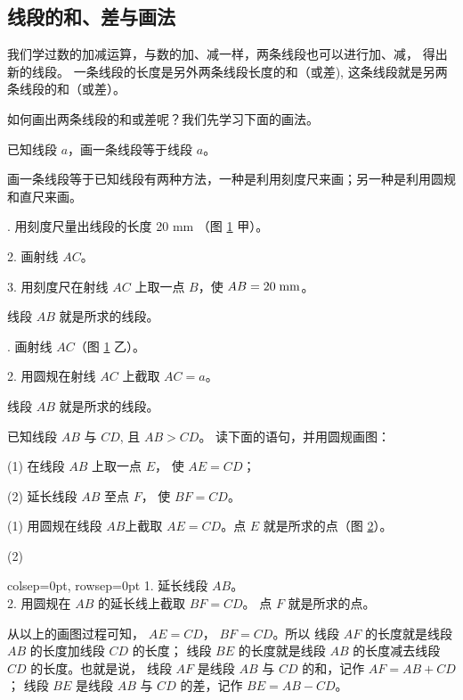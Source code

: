 \subsection{线段的和、差与画法}\label{subsec:czjh1-1-4}

我们学过数的加减运算，与数的加、减一样，两条线段也可以进行加、减， 得出新的线段。
一条线段的长度是另外两条线段长度的和（或差), 这条线段就是另两条线段的和（或差）。

如何画出两条线段的和或差呢？我们先学习下面的画法。

\liti 已知线段 $a$，画一条线段等于线段 $a$。

画一条线段等于已知线段有两种方法，一种是利用刻度尺来画；另一种是利用圆规和直尺来画。

\begin{figure}[htbp]
    \centering
    
    \caption{}\label{fig:czjh1-1-15}
\end{figure}

. 用刻度尺量出线段的长度 20 mm （图 \ref{fig:czjh1-1-15} 甲）。

2. 画射线 $AC$。

3. 用刻度尺在射线 $AC$ 上取一点 $B$，使 $AB = 20 \;\mathord{\text{mm}}$。

线段 $AB$ 就是所求的线段。


. 画射线 $AC$（图 \ref{fig:czjh1-1-15} 乙）。

2. 用圆规在射线 $AC$ 上截取 $AC = a$。

线段 $AB$ 就是所求的线段。


\liti 已知线段 $AB$ 与 $CD$, 且 $AB > CD$。 读下面的语句，并用圆规画图：

(1) 在线段 $AB$ 上取一点 $E$， 使 $AE = CD$；

(2) 延长线段 $AB$ 至点 $F$， 使 $BF = CD$。

\begin{figure}[htbp]
    \centering
    
    \caption{}\label{fig:czjh1-1-16}
\end{figure}


\huafa (1) 用圆规在线段 $AB$上截取 $AE = CD$。点 $E$ 就是所求的点（图 \ref{fig:czjh1-1-16}）。

(2) \begin{tblr}[t]{colsep=0pt, rowsep=0pt}
    1. 延长线段 $AB$。 \\
    2. 用圆规在 $AB$ 的延长线上截取 $BF = CD$。 点 $F$ 就是所求的点。
\end{tblr}

从以上的画图过程可知， $AE = CD$， $BF = CD$。所以
线段 $AF$ 的长度就是线段 $AB$ 的长度加线段 $CD$ 的长度；
线段 $BE$ 的长度就是线段 $AB$ 的长度减去线段 $CD$ 的长度。也就是说，
线段 $AF$ 是线段 $AB$ 与 $CD$ 的和，记作 $AF = AB + CD$；
线段 $BE$ 是线段 $AB$ 与 $CD$ 的差，记作 $BE = AB - CD$。

